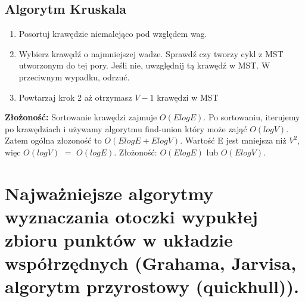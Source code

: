 \documentclass[12pt]{article}
\begin{document}
    \subsection{Algorytm Kruskala}

    \begin{enumerate}
        \item Posortuj krawędzie niemalejąco pod względem wag.
        \item Wybierz krawędź o najmniejszej wadze. Sprawdź czy tworzy cykl z MST utworzonym do tej pory. Jeśli nie, uwzględnij tą krawędź w MST. W przeciwnym wypadku, odrzuć.
        \item Powtarzaj krok 2 aż otrzymasz $V-1$ krawędzi w MST
    \end{enumerate}

    \textbf{Złożoność:} Sortowanie krawędzi zajmuje $O(ElogE)$. Po sortowaniu, iterujemy po krawędziach i używamy algorytmu find-union który może zająć $O(logV)$. Zatem ogólna złozoność to $O(ElogE+ElogV)$. Wartość E jest mniejsza niż $V^2$, więc $O(logV)$ $=$ $O(logE)$. Złożoność: $O(ElogE)$ lub $O(ElogV)$.

    \newpage

    \section{Najważniejsze algorytmy wyznaczania otoczki wypukłej zbioru punktów w układzie współrzędnych (Grahama, Jarvisa, algorytm przyrostowy (quickhull)).}
\end{document}
